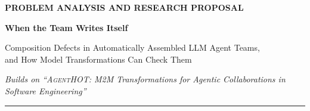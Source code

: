 \documentclass[10pt,a4paper]{article}
\newcommand{\tool}{\textsc{AgentHOT}}
\begin{document}
\thispagestyle{plain}
\begin{center}
{\sffamily\footnotesize\bfseries\color{accent}\MakeUppercase{Problem analysis and research proposal}}\par
\vspace{6pt}
{\sffamily\bfseries\fontsize{22}{26}\selectfont\color{accent}When the Team Writes Itself\par}
\vspace{6pt}
{\sffamily\large Composition Defects in Automatically Assembled LLM Agent Teams,\\
and How Model Transformations Can Check Them\par}
\vspace{10pt}
{\small\itshape Builds on ``\tool{}: M2M Transformations for Agentic
Collaborations in Software Engineering''~\cite{agenthot2026}\par}
\vspace{8pt}
{\color{accent!40}\rule{0.35\textwidth}{0.6pt}}
\end{center}
\vspace{4pt}
\end{document}
